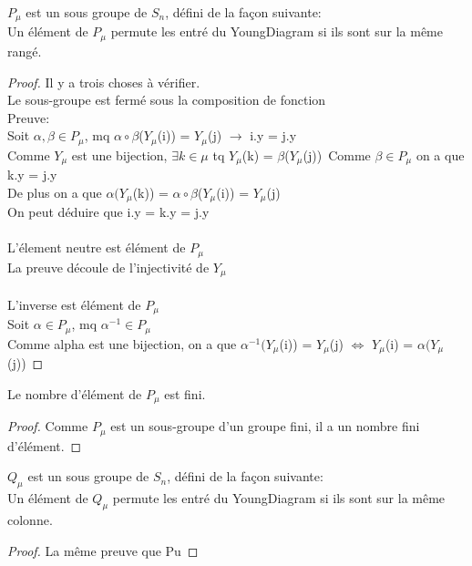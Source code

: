 \begin{definition}[Pu]
    \label{Pu}
    \leanok
    $P_{\mu}$ est un sous groupe de $S_{n}$, défini de la façon suivante:\\
    Un élément de $P_{\mu}$ permute les entré du YoungDiagram si ils sont sur la même rangé.
\end{definition}
\begin{proof}
    \leanok
    Il y a trois choses à vérifier.\\
    Le sous-groupe est fermé sous la composition de fonction\\
    Preuve:\\
    Soit $\alpha, \beta \in P_{\mu}$, mq $\alpha \circ \beta$($Y_{\mu}$(i)) = $Y_{\mu}$(j) $\to$ i.y = j.y\\
    Comme $Y_{\mu}$ est une bijection, $\exists k \in \mu$ tq $Y_{\mu}$(k) = $\beta$($Y_{\mu}$(j))\
    Comme $\beta \in P_{\mu}$ on a que k.y = j.y\\
    De plus on a que $\alpha (Y_{\mu}$(k)) = $\alpha \circ \beta$($Y_{\mu}$(i)) = $Y_{\mu}$(j)\\
    On peut déduire que i.y = k.y = j.y\\
    \\
    L'élement neutre est élément de $P_{\mu}$\\
    La preuve découle de l'injectivité de $Y_{\mu}$\\
    \\
    L'inverse est élément de $P_{\mu}$\\
    Soit $\alpha \in P_{\mu}$, mq $\alpha^{-1} \in P_{\mu}$\\
    Comme alpha est une bijection, on a que $\alpha^{-1} (Y_{\mu}$(i)) = $Y_{\mu}$(j) $\Leftrightarrow$ $Y_{\mu}$(i) = $\alpha (Y_{\mu}$(j))
\end{proof}

\begin{definition}[PuCard]
    \label{PuCard}
    \leanok
    Le nombre d'élément de $P_{\mu}$ est fini.
\end{definition}
\begin{proof}
    \leanok
    Comme $P_{\mu}$ est un sous-groupe d'un groupe fini, il a un nombre fini d'élément.
\end{proof}

\begin{definition}[Qu]
    \label{Qu}
    \leanok
    $Q_{\mu}$ est un sous groupe de $S_{n}$, défini de la façon suivante:\\
    Un élément de $Q_{\mu}$ permute les entré du YoungDiagram si ils sont sur la même colonne.
\end{definition}
\begin{proof}
    \leanok
    La même preuve que Pu
\end{proof}

